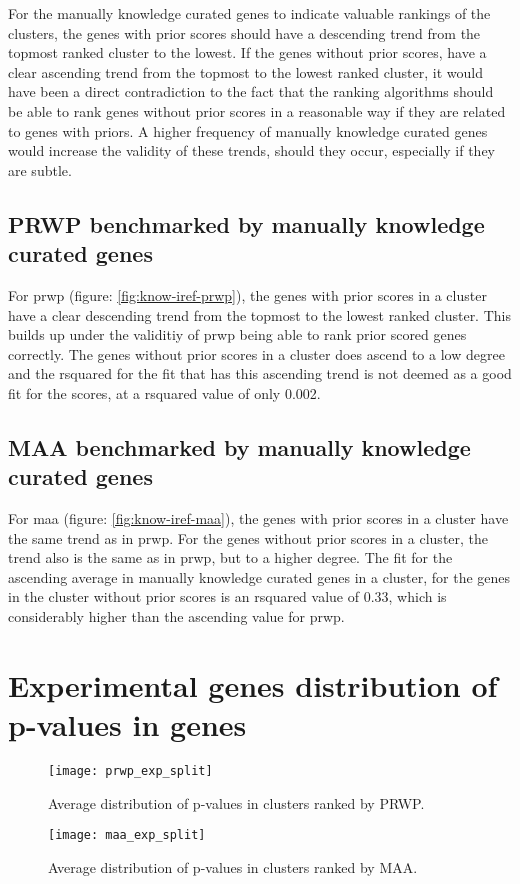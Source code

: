 For the manually knowledge curated genes to indicate valuable rankings of the
clusters, the genes with prior scores should have a descending trend from the
topmost ranked cluster to the lowest. If the genes without prior scores, have
a clear ascending trend from the topmost to the lowest ranked cluster, it would
have been a direct contradiction to the fact that the ranking algorithms should
be able to rank genes without prior scores in a reasonable way if they are
related to genes with priors. A higher frequency of manually knowledge curated
genes would increase the validity of these trends, should they occur,
especially if they are subtle.

\subsection{PRWP benchmarked by manually knowledge curated genes}
For \gls{prwp} (figure: \ref{fig:know-iref-prwp}), the genes with prior scores in
a cluster have a clear descending trend from the topmost to the lowest ranked
cluster. This builds up under the validitiy of \gls{prwp} being able to rank
prior scored genes correctly. The genes without prior scores in a cluster does
ascend to a low degree and the \gls{rsquared} for the fit that has this
ascending trend is not deemed as a good fit for the scores, at a \gls{rsquared}
value of only 0.002.

\subsection{MAA benchmarked by manually knowledge curated genes}
For \gls{maa} (figure: \ref{fig:know-iref-maa}), the genes with prior scores in a
cluster have the same trend as in \gls{prwp}. For the genes without prior scores
in a cluster, the trend also is the same as in \gls{prwp}, but to a higher
degree. The fit for the ascending average in manually knowledge curated genes in
a cluster, for the genes in the cluster without prior scores is an
\gls{rsquared} value of 0.33, which is considerably higher than the ascending
value for \gls{prwp}.

\section{Experimental genes distribution of p-values in genes}
\begin{sidewaysfigure}
    \texttt{[image: prwp\_exp\_split]}
    \caption{Average distribution of p-values in clusters ranked by PRWP.}
    \label{fig:exp-iref-prwp}
\end{sidewaysfigure}
\begin{sidewaysfigure}
    \texttt{[image: maa\_exp\_split]}
    \caption{Average distribution of p-values in clusters ranked by MAA.}
    \label{fig:exp-iref-maa}
\end{sidewaysfigure}

